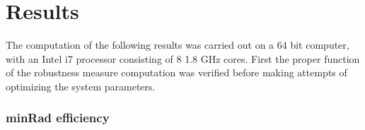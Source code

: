 \chapter{Results} \label {results}
    
    The computation of the following results was carried out on a 64 bit computer, with an Intel i7 processor consisting of 8 1.8 GHz cores. 
    First the proper function of the robustness measure computation was verified before making attempts of optimizing the system parameters.   

    

    


    \subsection{minRad efficiency}


